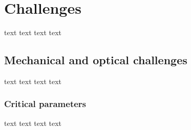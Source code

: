 \chapter{Challenges}
\label{sec:challenges}

text text text text

\section{Mechanical and optical challenges}
\label{sub:mechanicalChallenges}

text text text text	


\subsection{Critical parameters}
\label{sub:criticalParameters}

text text text text
